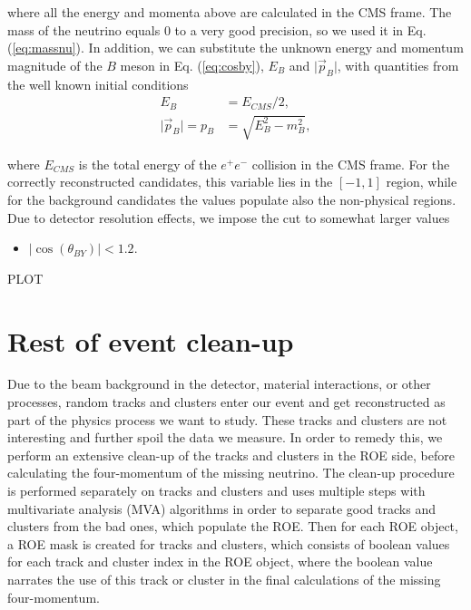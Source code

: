 \documentclass[oneside,a4paper,openany,12pt]{scrbook}
\begin{document}
where all the energy and momenta above are calculated in the CMS frame. The mass of the neutrino equals 0 to a very good precision, so we used it in Eq. (\ref{eq:massnu}). In addition, we can substitute the unknown energy and momentum magnitude of the $B$ meson in Eq. (\ref{eq:cosby}), $E_B$ and $\vert \vec{p}_B \vert$, with quantities from the well known initial conditions
\begin{align}
E_B &= E_{CMS} / 2,\\
\vert \vec{p}_B \vert = p_B &= \sqrt{E_B^2 - m_B^2},
\end{align} 

where $E_{CMS}$ is the total energy of the $e^+e^-$ collision in the CMS frame. For the correctly reconstructed candidates, this variable  lies in the $[-1,1]$ region, while for the background candidates the values populate also the non-physical regions. Due to detector resolution effects, we impose the cut to somewhat larger values
\begin{itemize}
\item $\vert \cos \left(\theta_{BY}\right) \vert < 1.2$.
\end{itemize}

\begin{center}
PLOT
\end{center}

\section{Rest of event clean-up}

Due to the beam background in the detector, material interactions, or other processes, random tracks and clusters enter our event and get reconstructed as part of the physics process we want to study. These tracks and clusters are not interesting and further spoil the data we measure. In order to remedy this, we perform an extensive clean-up of the tracks and clusters in the ROE side, before calculating the four-momentum of the missing neutrino. The clean-up procedure is performed separately on tracks and clusters and uses multiple steps with multivariate analysis (MVA) algorithms in order to separate good tracks and clusters from the bad ones, which populate the ROE. Then for each ROE object, a ROE mask is created for tracks and clusters, which consists of boolean values for each track and cluster index in the ROE object, where the boolean value narrates the use of this track or cluster in the final calculations of the missing four-momentum.
\end{document}
